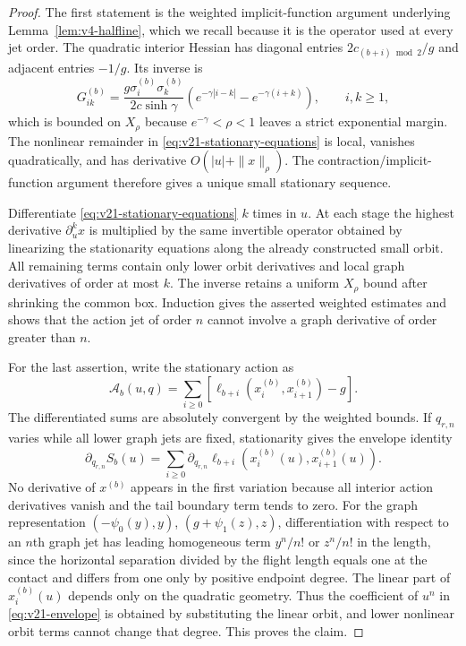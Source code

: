 \begin{proof}
The first statement is the weighted implicit-function argument underlying
Lemma~\ref{lem:v4-halfline}, which we recall because it is the operator used
at every jet order.  The quadratic interior Hessian has diagonal entries
$2c_{(b+i)\bmod2}/g$ and adjacent entries $-1/g$.  Its inverse is
\[
 G^{(b)}_{ik}=\frac{g\sigma_i^{(b)}\sigma_k^{(b)}}
 {2c\sinh\gamma}
 \left(e^{-\gamma|i-k|}-e^{-\gamma(i+k)}\right),
 \qquad i,k\ge1,
\]
which is bounded on $X_\rho$ because $e^{-\gamma}<\rho<1$ leaves a strict
exponential margin.  The nonlinear remainder in
\eqref{eq:v21-stationary-equations} is local, vanishes quadratically, and
has derivative $O(|u|+\|x\|_\rho)$.  The contraction/implicit-function
argument therefore gives a unique small stationary sequence.

Differentiate \eqref{eq:v21-stationary-equations} $k$ times in $u$.  At each
stage the highest derivative $\partial_u^kx$ is multiplied by the same
invertible operator obtained by linearizing the stationarity equations along
the already constructed small orbit.  All remaining terms contain only
lower orbit derivatives and local graph derivatives of order at most $k$.
The inverse retains a uniform $X_\rho$ bound after shrinking the common box.
Induction gives the asserted weighted estimates and shows that the action jet
of order $n$ cannot involve a graph derivative of order greater than $n$.

For the last assertion, write the stationary action as
\[
 \mathscr A_b(u,q)=\sum_{i\ge0}
 [\ell_{b+i}(x_i^{(b)},x_{i+1}^{(b)})-g].
\]
The differentiated sums are absolutely convergent by the weighted bounds.
If $q_{r,n}$ varies while all lower graph jets are fixed, stationarity gives
the envelope identity
\begin{equation}\label{eq:v21-envelope}
 \partial_{q_{r,n}}S_b(u)
 =\sum_{i\ge0}
 \partial_{q_{r,n}}\ell_{b+i}
       (x_i^{(b)}(u),x_{i+1}^{(b)}(u)).
\end{equation}
No derivative of $x^{(b)}$ appears in the first variation because all
interior action derivatives vanish and the tail boundary term tends to zero.
For the graph representation
$(-\psi_0(y),y)$, $(g+\psi_1(z),z)$, differentiation with respect to an
$n$th graph jet has leading homogeneous term $y^n/n!$ or $z^n/n!$ in the
length, since the horizontal separation divided by the flight length equals
one at the contact and differs from one only by positive endpoint degree.
The linear part of $x_i^{(b)}(u)$ depends only on the quadratic geometry.
Thus the coefficient of $u^n$ in \eqref{eq:v21-envelope} is obtained by
substituting the linear orbit, and lower nonlinear orbit terms cannot change
that degree.  This proves the claim.
\end{proof}

